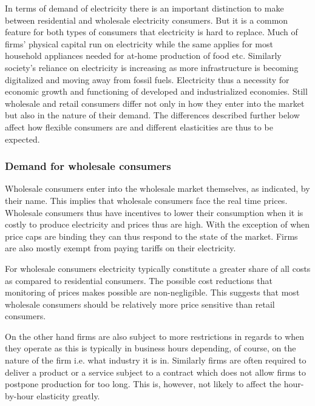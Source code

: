 In terms of demand of electricity there is an important distinction to make between residential and wholesale electricity consumers. But it is a common feature for both types of consumers that electricity is hard to replace. Much of firms' physical capital run on electricity while the same applies for most household appliances needed for at-home production of food etc. Similarly society's reliance on electricity is increasing as more infrastructure is becoming digitalized and moving away from fossil fuels. Electricity thus a necessity for economic growth and functioning of developed and industrialized economies. Still wholesale and retail consumers differ not only in how they enter into the market but also in the nature of their demand. The differences described further below affect how flexible consumers are and different elasticities are thus to be expected.

\subsubsection*{Demand for wholesale consumers}
\vspace{-5mm}
Wholesale consumers enter into the wholesale market themselves, as indicated, by their name. This implies that wholesale consumers face the real time prices. Wholesale consumers thus have incentives to lower their consumption when it is costly to produce electricity and prices thus are high. With the exception of when price caps are binding they can thus respond to the state of the market. Firms are also mostly exempt from paying tariffs on their electricity.
\par

For wholesale consumers electricity typically constitute a greater share of all costs as compared to residential consumers. The possible cost reductions that monitoring of prices makes possible are non-negligible. This suggests that most wholesale consumers should be relatively more price sensitive than retail consumers.
\par

On the other hand firms are also subject to more restrictions in regards to when they operate as this is typically in business hours depending, of course, on the nature of the firm i.e. what industry it is in. Similarly firms are often required to deliver a product or a service subject to a contract which does not allow firms to postpone production for too long. This is, however, not likely to affect the hour-by-hour elasticity greatly. %

